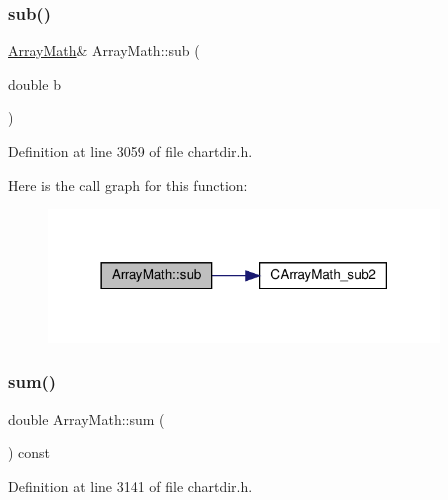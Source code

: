 \subsubsection{\texorpdfstring{sub()}{sub()}\hspace{0.1cm}{\footnotesize\ttfamily [2/2]}}
{\footnotesize\ttfamily \hyperlink{class_array_math}{Array\+Math}\& Array\+Math\+::sub (\begin{DoxyParamCaption}\item[{double}]{b }\end{DoxyParamCaption})\hspace{0.3cm}{\ttfamily [inline]}}



Definition at line 3059 of file chartdir.\+h.

Here is the call graph for this function\+:
\nopagebreak
\begin{figure}[H]
\begin{center}
\leavevmode
\includegraphics[width=294pt]{class_array_math_a4c05dccafd9c44167c2e158427ce3099_cgraph}
\end{center}
\end{figure}
\mbox{\label{class_array_math_a864604ac04b95fa04fcd511d1845ebbd}} 
\subsubsection{\texorpdfstring{sum()}{sum()}}
{\footnotesize\ttfamily double Array\+Math\+::sum (\begin{DoxyParamCaption}{ }\end{DoxyParamCaption}) const\hspace{0.3cm}{\ttfamily [inline]}}



Definition at line 3141 of file chartdir.\+h.

